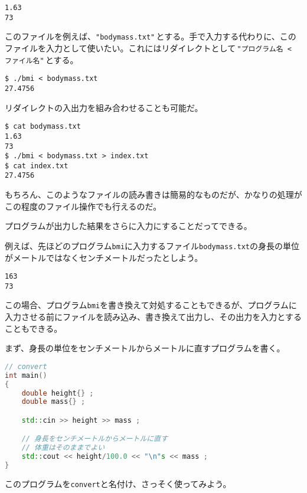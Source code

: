 \begin{lstlisting}[style=terminal]
1.63
73
\end{lstlisting}

このファイルを例えば、\texttt{"bodymass.txt"}\,とする。手で入力する代わりに、このファイルを入力として使いたい。これにはリダイレクトとして\,\texttt{"プログラム名 < ファイル名"}\,とする。

\begin{lstlisting}[style=terminal]
$ ./bmi < bodymass.txt
27.4756
\end{lstlisting}

リダイレクトの入出力を組み合わせることも可能だ。

\begin{lstlisting}[style=terminal]
$ cat bodymass.txt
1.63
73
$ ./bmi < bodymass.txt > index.txt
$ cat index.txt
27.4756
\end{lstlisting}

もちろん、このようなファイルの読み書きは簡易的なものだが、かなりの処理がこの程度のファイル操作でも行えるのだ。


プログラムが出力した結果をさらに入力にすることだってできる。

例えば、先ほどのプログラム\texttt{bmi}に入力するファイル\texttt{bodymass.txt}の身長の単位がメートルではなくセンチメートルだったとしよう。

\begin{lstlisting}[style=terminal]
163
73
\end{lstlisting}

この場合、プログラム\texttt{bmi}を書き換えて対処することもできるが、プログラムに入力させる前にファイルを読み込み、書き換えて出力し、その出力を入力とすることもできる。

まず、身長の単位をセンチメートルからメートルに直すプログラムを書く。

\begin{lstlisting}[language={C++}]
// convert
int main()
{
    double height{} ;
    double mass{} ;

    std::cin >> height >> mass ;

    // 身長をセンチメートルからメートルに直す
    // 体重はそのままでよい
    std::cout << height/100.0 << "\n"s << mass ;
}
\end{lstlisting}

このプログラムを\texttt{convert}と名付け、さっそく使ってみよう。

